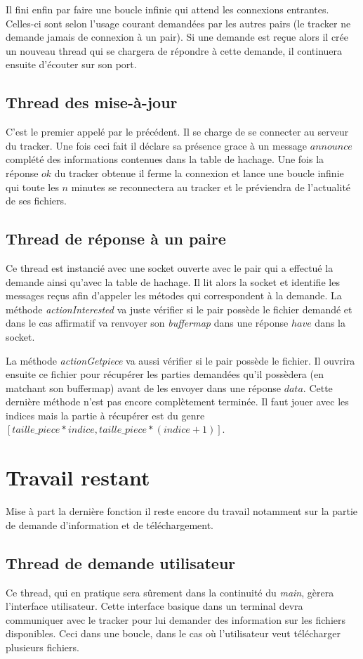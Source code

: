 Il fini enfin par faire une boucle infinie qui attend les connexions entrantes. Celles-ci sont selon l'usage courant demandées par les autres pairs (le tracker ne demande jamais de connexion à un pair). Si une demande est reçue alors il crée un nouveau thread qui se chargera de répondre à cette demande, il continuera ensuite d'écouter sur son port.

\subsection{Thread des mise-à-jour}
C'est le premier appelé par le précédent. Il se charge de se connecter au serveur du tracker. Une fois ceci fait il déclare sa présence grace à un message $announce$ complété des informations contenues dans la table de hachage. 
Une fois la réponse $ok$ du tracker obtenue il ferme la connexion et lance une boucle infinie qui toute les $n$ minutes se reconnectera au tracker et le préviendra de l'actualité de ses fichiers. 

\subsection{Thread de réponse à un paire}
Ce thread est instancié avec une socket ouverte avec le pair qui a effectué la demande ainsi qu'avec la table de hachage. Il lit alors la socket et identifie les messages reçus afin d'appeler les métodes qui correspondent à la demande. La méthode \textit{actionInterested} va juste vérifier si le pair possède le fichier demandé et dans le cas affirmatif va renvoyer son \textit{buffermap} dans une réponse $have$ dans la socket.

La méthode \textit{actionGetpiece} va aussi vérifier si le pair possède le fichier. Il ouvrira ensuite ce fichier pour récupérer les parties demandées qu'il possèdera (en matchant son buffermap) avant de les envoyer dans une réponse $data$.
Cette dernière méthode n'est pas encore complètement terminée. Il faut jouer avec les indices mais la partie à récupérer est du genre $[taille\_piece*indice,taille\_piece*(indice+1)]$.


\section{Travail restant}
Mise à part la dernière fonction il reste encore du travail notamment sur la partie de demande d'information et de téléchargement.

\subsection{Thread de demande utilisateur} 
Ce thread, qui en pratique sera sûrement dans la continuité du \textit{main}, gèrera l'interface utilisateur. Cette interface basique dans un terminal devra communiquer avec le tracker pour lui demander des information sur les fichiers disponibles. Ceci dans une boucle, dans le cas où l'utilisateur veut télécharger plusieurs fichiers.

